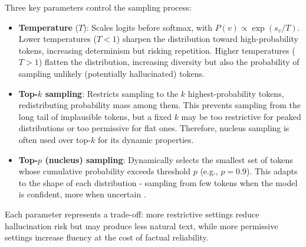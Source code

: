 Three key parameters control the sampling process:
\begin{itemize}[noitemsep]
    \item \textbf{Temperature} ($T$): Scales logits before softmax, with \(P(v) \propto \exp(s_v / T)\). Lower temperatures ($T < 1$) sharpen the distribution toward high-probability tokens, increasing determinism but risking repetition. Higher temperatures ($T > 1$) flatten the distribution, increasing diversity but also the probability of sampling unlikely (potentially hallucinated) tokens.
    \item \textbf{Top-$k$ sampling}: Restricts sampling to the $k$ highest-probability tokens, redistributing probability mass among them. This prevents sampling from the long tail of implausible tokens, but a fixed $k$ may be too restrictive for peaked distributions or too permissive for flat ones. Therefore, nucleus sampling is often used over top-$k$ for its dynamic properties.
    \item \textbf{Top-$p$ (nucleus) sampling}: Dynamically selects the smallest set of tokens whose cumulative probability exceeds threshold $p$ (e.g., $p=0.9$). This adapts to the shape of each distribution - sampling from few tokens when the model is confident, more when uncertain \citep{holtzman2020curiouscaseneuraltext}.
\end{itemize}
Each parameter represents a trade-off: more restrictive settings reduce hallucination risk but may produce less natural text, while more permissive settings increase fluency at the cost of factual reliability.

\FloatBarrier